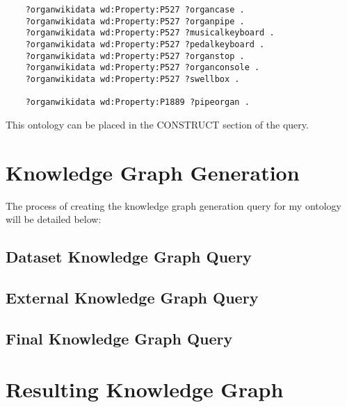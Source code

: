 \begin{lstlisting}
	?organwikidata wd:Property:P527 ?organcase .
	?organwikidata wd:Property:P527 ?organpipe .
	?organwikidata wd:Property:P527 ?musicalkeyboard .
	?organwikidata wd:Property:P527 ?pedalkeyboard .
	?organwikidata wd:Property:P527 ?organstop .
	?organwikidata wd:Property:P527 ?organconsole .
	?organwikidata wd:Property:P527 ?swellbox .

	?organwikidata wd:Property:P1889 ?pipeorgan .
\end{lstlisting}

This ontology can be placed in the CONSTRUCT section of the query.

\section{Knowledge Graph Generation}
\hspace*{0.5cm} The process of creating the knowledge graph generation query for my ontology will be detailed below:

\subsection{Dataset Knowledge Graph Query}
\hspace*{0.5cm} 


\subsection{External Knowledge Graph Query}
\hspace*{0.5cm} 


\subsection{Final Knowledge Graph Query}
\hspace*{0.5cm} 


\section{Resulting Knowledge Graph}
\hspace*{0.5cm} 




